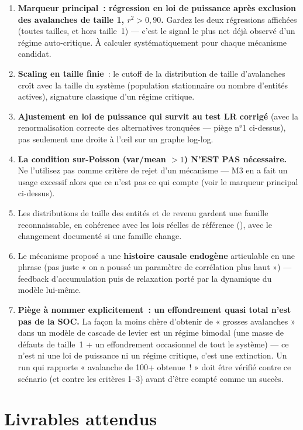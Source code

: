 \begin{enumerate}[leftmargin=*]
  \item \textbf{Marqueur principal~: régression en loi de puissance après
    exclusion des avalanches de taille 1, $r^2 > 0{,}90$.} Gardez les deux
    régressions affichées (toutes tailles, et hors taille~1) — c'est le
    signal le plus net déjà observé d'un régime auto-critique. À calculer
    systématiquement pour chaque mécanisme candidat.
  \item \textbf{Scaling en taille finie}~: le cutoff de la distribution de
    taille d'avalanches croît avec la taille du système (population
    stationnaire ou nombre d'entités actives), signature classique d'un
    régime critique.
  \item \textbf{Ajustement en loi de puissance qui survit au test LR
    corrigé} (avec la renormalisation correcte des alternatives tronquées —
    piège n°1 ci-dessus), pas seulement une droite à l'œil sur un graphe
    log-log.
  \item \textbf{La condition sur-Poisson (var/mean $>1$) N'EST PAS
    nécessaire.} Ne l'utilisez pas comme critère de rejet d'un mécanisme —
    M3 en a fait un usage excessif alors que ce n'est pas ce qui compte
    (voir le marqueur principal ci-dessus).
  \item Les distributions de taille des entités et de revenu gardent une
    famille reconnaissable, en cohérence avec les lois réelles de
    référence (), avec le changement documenté si une
    famille change.
  \item Le mécanisme proposé a une \textbf{histoire causale endogène}
    articulable en une phrase (pas juste « on a poussé un paramètre de
    corrélation plus haut ») — feedback d'accumulation puis de relaxation
    porté par la dynamique du modèle lui-même.
  \item \textbf{Piège à nommer explicitement~: un effondrement quasi total
    n'est pas de la SOC.} La façon la moins chère d'obtenir de « grosses
    avalanches » dans un modèle de cascade de levier est un régime bimodal
    (une masse de défauts de taille~1 + un effondrement occasionnel de tout
    le système) — ce n'est ni une loi de puissance ni un régime critique,
    c'est une extinction. Un run qui rapporte « avalanche de 100+
    obtenue~! » doit être vérifié contre ce scénario (et contre les
    critères 1--3) avant d'être compté comme un succès.
\end{enumerate}

\section*{Livrables attendus}

